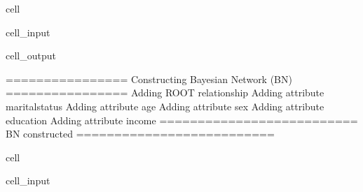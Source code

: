 \documentclass[letterpaper,10pt,english]{jupyterBook}
\begin{document}
\begin{sphinxuseclass}{cell}
\begin{sphinxVerbatimInput}
\begin{sphinxuseclass}{cell_input}
\end{sphinxuseclass}\end{sphinxVerbatimInput}
\begin{sphinxVerbatimOutput}

\begin{sphinxuseclass}{cell_output}
\begin{sphinxVerbatim}[commandchars=\\\{\}]
================ Constructing Bayesian Network (BN) ================
Adding ROOT relationship
Adding attribute marital\PYGZhy{}status
Adding attribute age
Adding attribute sex
Adding attribute education
Adding attribute income
========================== BN constructed ==========================
\end{sphinxVerbatim}

\noindent{}

\noindent{}

\noindent{}

\noindent{}

\noindent{}

\noindent{}

\noindent{}

\end{sphinxuseclass}\end{sphinxVerbatimOutput}

\end{sphinxuseclass}
\begin{sphinxuseclass}{cell}\begin{sphinxVerbatimInput}

\begin{sphinxuseclass}{cell_input}
\begin{sphinxVerbatim}[commandchars=\\\{\}]
 
    
 
    
 
    
 
    
\end{sphinxVerbatim}

\end{sphinxuseclass}\end{sphinxVerbatimInput}

\end{sphinxuseclass}
\sphinxstepscope
\end{document}
